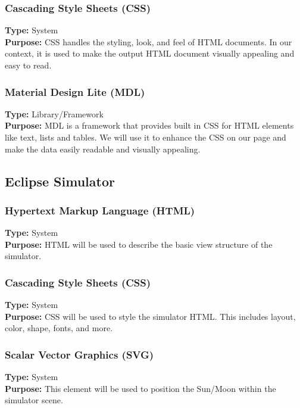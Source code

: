 \documentclass[10pt, onecolumn, draftclsnofoot, letterpaper, compsoc]{IEEEtran}
\begin{document}
    \subsubsection{Cascading Style Sheets (CSS)}
    \textbf{Type:} System \\
    \textbf{Purpose:} CSS handles the styling, look, and feel of HTML documents.
    In our context, it is used to make the output HTML document visually
    appealing and easy to read. \\

    \subsubsection{Material Design Lite (MDL)}
    \textbf{Type:} Library/Framework \\
    \textbf{Purpose:} MDL is a framework that provides built in CSS for HTML
    elements like text, lists and tables. We will use it to enhance the CSS on
    our page and make the data easily readable and visually appealing. \\


\subsection{Eclipse Simulator}

  \subsubsection{Hypertext Markup Language (HTML)}
  \textbf{Type:} System \\
  \textbf{Purpose:} HTML will be used to describe the basic
  view structure of the simulator. \\

  \subsubsection{Cascading Style Sheets (CSS)}
  \textbf{Type:} System \\
  \textbf{Purpose:} CSS will be used to style the simulator
  HTML. This includes layout, color, shape, fonts,
  and more. \\

  \subsubsection{Scalar Vector Graphics (SVG)}
  \textbf{Type:} System \\
  \textbf{Purpose:} This element will be used to
  position the Sun/Moon within the simulator scene. \\
\end{document}
